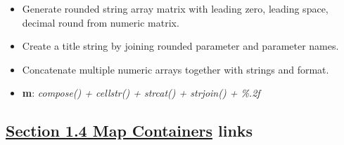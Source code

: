 \documentclass[
]{book}
\providecommand{\tightlist}{%
  \setlength{\itemsep}{0pt}\setlength{\parskip}{0pt}}
\begin{document}
\begin{enumerate}
  \begin{itemize}
  \tightlist
  \item
    Generate rounded string array matrix with leading zero, leading space, decimal round from numeric matrix.
  \item
    Create a title string by joining rounded parameter and parameter names.
  \item
    Concatenate multiple numeric arrays together with strings and format.
  \item
    \textbf{m}: \emph{compose() + cellstr() + strcat() + strjoin() + \%.2f}
  \end{itemize}
\end{enumerate}

\hypertarget{section-1.4-map-containersmap-containers-links}{%
\subsection{\texorpdfstring{\protect\hyperlink{map-containers}{Section 1.4 Map Containers} links}{Section 1.4 Map Containers links}}\label{section-1.4-map-containersmap-containers-links}}
\end{document}

